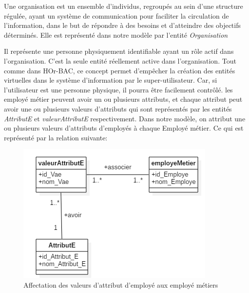 \label{chapAHOr-BAC}


\label{sectionConcept}

\label{sectionOrganisation} 
Une organisation est un ensemble d'individus, regroupés au sein d'une structure régulée, ayant un système de communication pour faciliter la circulation de l'information, dans le but de répondre à des besoins et d'atteindre des objectifs déterminés. Elle est représenté dans notre modèle par l'entité \textit{Organisation}

\label{sectionEmployeMetier} 
Il représente une personne physiquement identifiable ayant un rôle actif dans l'organisation. C'est la seule entité réellement active dans l'organisation. Tout comme dans HOr-BAC, ce concept permet d'empêcher la création des entités virtuelles dans le système d'information par le super-utilisateur. Car, si l'utilisateur est une personne physique, il pourra être facilement contrôlé. les employé métier peuvent avoir un ou plusieurs attributs, et chaque attribut peut avoir une ou plusieurs valeurs d'attributs qui sont représentés par les entités \textit{AttributE} et \textit{valeurAttributE} respectivement. Dans notre modèle, on attribut une ou plusieurs valeurs d'attributs d'employés à chaque Employé métier. Ce qui est représenté par la relation suivante: %

\begin{figure}[h!]
    \centering
		\includegraphics[scale=0.7]{chap3/images/employe_attribut.png}
    \caption{Affectation des valeurs d'attribut d'employé aux employé métiers}
	 \label{figemploye}
\end{figure} 

